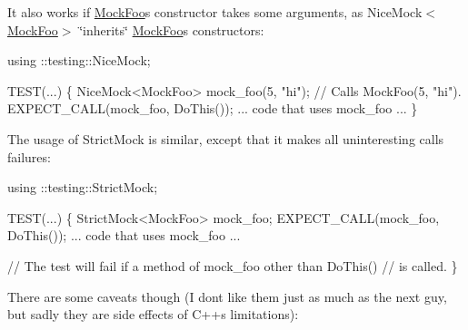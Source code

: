 It also works if {\ttfamily \hyperlink{class_mock_foo}{Mock\+Foo}}\textquotesingle{}s constructor takes some arguments, as {\ttfamily Nice\+Mock$<$\hyperlink{class_mock_foo}{Mock\+Foo}$>$} \char`\"{}inherits\char`\"{} {\ttfamily \hyperlink{class_mock_foo}{Mock\+Foo}}\textquotesingle{}s constructors\+:


\begin{DoxyCode}
using ::testing::NiceMock;

TEST(...) \{
  NiceMock<MockFoo> mock\_foo(5, "hi");  // Calls MockFoo(5, "hi").
  EXPECT\_CALL(mock\_foo, DoThis());
  ... code that uses mock\_foo ...
\}
\end{DoxyCode}


The usage of {\ttfamily Strict\+Mock} is similar, except that it makes all uninteresting calls failures\+:


\begin{DoxyCode}
using ::testing::StrictMock;

TEST(...) \{
  StrictMock<MockFoo> mock\_foo;
  EXPECT\_CALL(mock\_foo, DoThis());
  ... code that uses mock\_foo ...

  // The test will fail if a method of mock\_foo other than DoThis()
  // is called.
\}
\end{DoxyCode}


There are some caveats though (I don\textquotesingle{}t like them just as much as the next guy, but sadly they are side effects of C++\textquotesingle{}s limitations)\+:


